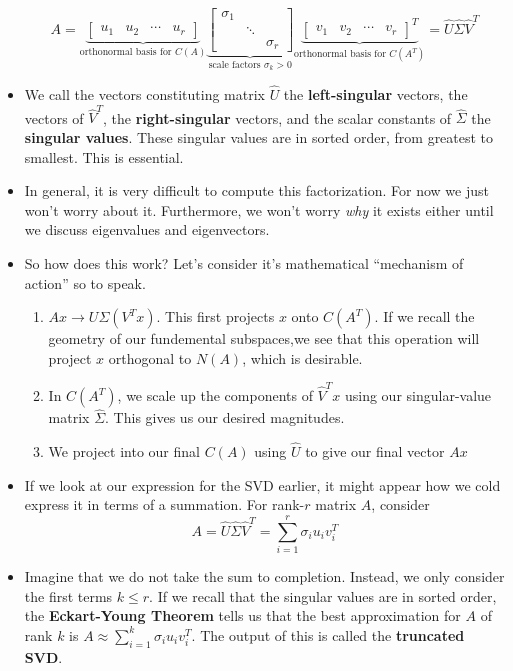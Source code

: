 \documentclass[11pt]{article}
\begin{document}
\begin{itemize}
		$$A = \underbrace{\begin{bmatrix}
		  u_1 & u_2 & \cdots & u_r
  \end{bmatrix}}_{\text{orthonormal basis for }C(A)} 
  \underbrace{\begin{bmatrix}
\sigma_1 &  & \\
   & \ddots & \\
   &  & \sigma_r
\end{bmatrix}}_{\text{scale factors } \sigma_k > 0}
\underbrace{
\begin{bmatrix}
  v_1 & v_2 & \cdots & v_r
\end{bmatrix}^T
}_{\text{orthonormal basis for }C(A^T)} = \hat{U} \hat{\Sigma} \hat{V}^T$$
\item We call the vectors constituting matrix $\hat{U}$ the \textbf{left-singular} vectors, the vectors of $\hat{V}^{T}$, the \textbf{right-singular} vectors, and the scalar constants of $\hat{\Sigma}$ the \textbf{singular values}. These singular values are in sorted order, from greatest to smallest. This is essential.
\item In general, it is very difficult to compute this factorization. For now we just won't worry about it. Furthermore, we won't worry \textit{why} it exists either until we discuss eigenvalues and eigenvectors.
\item So how does this work? Let's consider it's mathematical ``mechanism of action'' so to speak.
	\begin{enumerate}
		\item $Ax \to U\Sigma (V^{T} x)$. This first projects $x$ onto $C(A^{T})$. If we recall the geometry of our fundemental subspaces,we see that this operation will project $x$ orthogonal to $N(A)$, which is desirable. 
		\item In $C(A^{T})$, we scale up the components of $\hat{V}^{T}x$ using our singular-value matrix $\hat{\Sigma}$. This gives us our desired magnitudes. 
		\item We project into our final $C(A)$ using $\hat{U}$ to give our final vector $Ax$
	\end{enumerate}
\item If we look at our expression for the SVD earlier, it might appear how we cold express it in terms of a summation. For rank-$r$ matrix $A$, consider
	$$A = \hat{U}\hat{\Sigma} \hat{V}^{T} = \sum_{i=1}^{r}\sigma_{i}u_{i}v^{T}_{i}$$
\item Imagine that we do not take the sum to completion. Instead, we only consider the first terms $k \leq r$. If we recall that the singular values are in sorted order, the \textbf{Eckart-Young Theorem} tells us that the best approximation for $A$ of rank $k$ is $A \approx \displaystyle \sum_{i=1}^{k}\sigma_{i}u_{i}v_{i}^{T}$. The output of this is called the \textbf{truncated SVD}.

\end{itemize}
\end{document}
